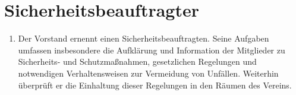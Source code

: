 \documentclass[fontsize=12pt,paper=a4,pagesize,headings=small]{scrartcl}
\begin{document}
\section{Sicherheitsbeauftragter}

\begin{enumerate}
    \item Der Vorstand ernennt einen Sicherheitsbeauftragten. Seine
        Aufgaben umfassen insbesondere die Aufklärung und Information der
        Mitglieder zu Sicherheits- und Schutzmaßnahmen, gesetzlichen
        Regelungen und notwendigen Verhaltensweisen zur Vermeidung von
        Unfällen. Weiterhin überprüft er die Einhaltung dieser Regelungen in
        den Räumen des Vereins.
\end{enumerate}
\end{document}
